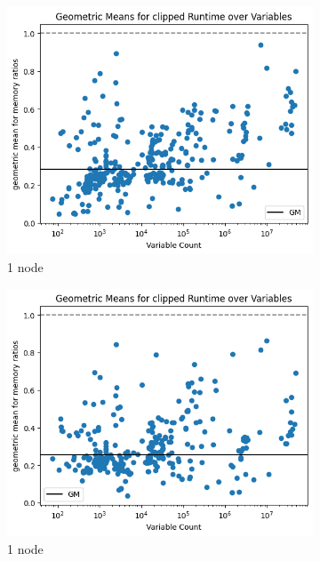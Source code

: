 \documentclass[12pt,a4paper,twoside]{scrartcl}
\numberwithin{equation}{section}
\begin{document}
\begin{figure}
  \center
  \begin{subfigure}[c]{.4\textwidth}
    \center
    \includegraphics[scale=.3]{plots/1node_compare/mem_gm_over_vars.png}
    \caption{1 node}
  \end{subfigure}
  \begin{subfigure}[c]{.4\textwidth}
    \center
    \includegraphics[scale=.3]{plots/4node_compare/mem_gm_over_vars.png}
    \caption{1 node}
  \end{subfigure}
  \begin{subfigure}[c]{.4\textwidth}

\end{subfigure}
\end{figure}
\end{document}
